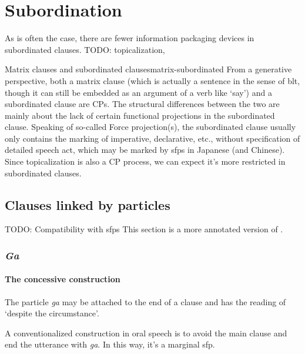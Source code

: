 \documentclass[UTF8, a4paper, oneside, scheme=plain]{ctexrep}
\newcommand*{\citesec}[1]{\S~{#1}}
\newcommand{\corpus}[1]{\emph{#1}}
\newcommand{\translate}[1]{`#1'}
\begin{document}
\chapter{Subordination}

As is often the case, there are fewer information packaging devices in subordinated clauses.
TODO: topicalization, 

\begin{theorybox}{Matrix clauses and subordinated clauses}{matrix-subordinated}
    From a generative perspective, both a matrix clause 
    (which is actually a sentence in the sense of \acs{blt}, 
    though it can still be embedded as an argument of a verb like \translate{say})
    and a subordinated clause are CPs.
    The structural differences between the two 
    are mainly about the lack of certain functional projections in the subordinated clause.
    Speaking of so-called Force projection(s),
    the subordinated clause usually only contains the marking of 
    imperative, declarative, etc.,
    without specification of detailed speech act,
    which may be marked by \ac{sfp}s in Japanese (and Chinese).
    Since topicalization is also a CP process,
    we can expect it's more restricted in subordinated clauses.
\end{theorybox}

\section{Clauses linked by particles}\label{sec:particle-linking-clause}

TODO: Compatibility with \ac{sfp}s
This section is a more annotated version of \citet[\citesec{6.3}]{akiyama2012japanese}.

\subsection{\corpus{Ga}}

\subsubsection{The concessive construction}

The particle \corpus{ga} may be attached to the end of a clause 
and has the reading of \translate{despite the circumstance}.

A conventionalized construction in oral speech is to avoid the main clause 
and end the utterance with \corpus{ga}.
In this way, it's a marginal \ac{sfp}.
\end{document}
